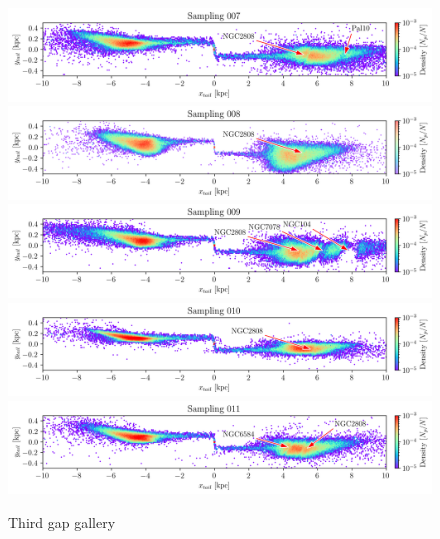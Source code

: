 \documentclass[draft]{aa}
\begin{document}
\begin{appendix}
    \begin{figure}
      \centering
      \includegraphics[width=\linewidth]{gallery_of_gaps_monte-carlo-007.png}
      \includegraphics[width=\linewidth]{gallery_of_gaps_monte-carlo-008.png}
      \includegraphics[width=\linewidth]{gallery_of_gaps_monte-carlo-009.png}      
      \includegraphics[width=\linewidth]{gallery_of_gaps_monte-carlo-010.png}
      \includegraphics[width=\linewidth]{gallery_of_gaps_monte-carlo-011.png}
      \caption{Third gap gallery}
      \label{fig:gallery2}
      \end{figure}        



\end{appendix}
\end{document}
